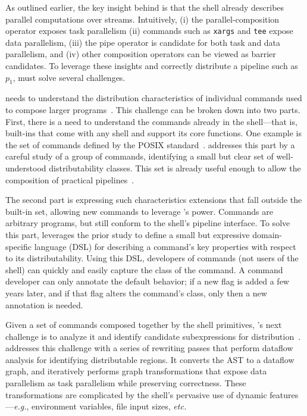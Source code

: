 \documentclass[sigplan,10pt,review,anonymous]{acmart}
\newcommand{\eg}{{\em e.g.}, }
\newcommand{\etc}{{\em etc.}\xspace}
\newcommand{\ttt}[1]{\texttt{\small #1}}
\newcommand{\nv}[1]{[{\color{cyan}#1 --- nv}]}
\newcommand{\kk}[1]{[{\color{magenta}#1 --- kk}]}
\begin{document}
As outlined earlier, the key insight behind \sys is that the shell already describes parallel computations over streams.
Intuitively,
 (i) the parallel-composition operator exposes task parallelism
 (ii) commands such as \ttt{xargs} and \ttt{tee} expose data parallelism,
 (iii) the pipe operator is candidate for both task and data parallelism, and
 (iv)  other composition operators can be viewed as barrier candidates.
To leverage these insights and correctly distribute a pipeline such as $p_1$, \sys must solve several challenges.

\sys needs to understand the distribution characteristics of individual commands used to compose larger programs~.
This challenge can be broken down into two parts.
First, there is a need to understand the commands already in the shell---that is, built-ins that come with any shell and support its core functions.
One example is the set of commands defined by the \textsc{POSIX} standard~\cite{posix}.
\sys addresses this part by a careful study of a group of commands, identifying a small but clear set of well-understood distributability classes.
This set is already useful enough to allow the composition of practical pipelines~.

The second part is expressing such characteristics extensions that fall outside the built-in set, allowing new commands to leverage \sys's power.
Commands are arbitrary programs, but still conform to the shell's pipeline interface.
To solve this part, \sys leverages the prior study to define a small but expressive domain-specific language (DSL) for describing a command's key properties with respect to its distributability.
Using this DSL, developers of commands (not users of the shell) can quickly and easily capture the class of the command.
A command developer can only annotate the default behavior;
  if a new flag is added a few years later, and if that flag alters the command's class, only then a new annotation is needed.

Given a set of commands composed together by the shell primitives, \sys's next challenge is to analyze it and identify candidate subexpressions for distribution~.
\sys addresses this challenge with a series of rewriting passes that perform dataflow analysis for identifying  distributable regions.
It converts the AST to a dataflow graph, and iteratively performs graph transformations that expose data parallelism as task parallelism while preserving correctness.
These transformations are complicated by the shell's pervasive use of dynamic features---\eg environment variables, file input sizes, \etc
\end{document}
